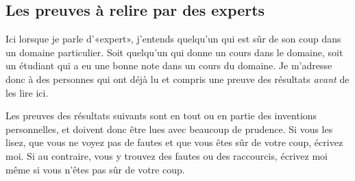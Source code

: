 \subsection{Les preuves à relire par des experts}

Ici lorsque je parle d'«expert», j'entends quelqu'un qui est sûr de son coup dans un domaine particulier. Soit quelqu'un qui donne un cours dans le domaine, soit un étudiant qui a eu une bonne note dans un cours du domaine. Je m'adresse donc à des personnes qui ont déjà lu et compris une preuve des résultats \emph{avant} de les lire ici.

Les preuves des résultats suivants sont en tout ou en partie des inventions personnelles, et doivent donc être lues avec beaucoup de prudence. Si vous les lisez, que vous ne voyez pas de fautes et que vous êtes sûr de votre coup, écrivez moi. Si au contraire, vous y trouvez des fautes ou des raccourcis, écrivez moi même si vous n'êtes pas sûr de votre coup.
